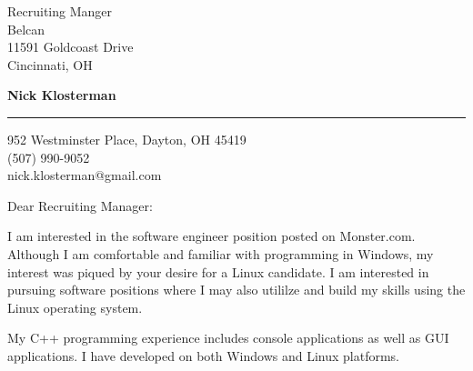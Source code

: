 \documentclass{letter} %
\begin{document}
\signature{Nick Klosterman}           %
\longindentation=0pt                       %
\let\raggedleft\raggedright                %
 
 
\begin{letter}{Recruiting Manger \\
Belcan  \\
11591 Goldcoast Drive\\
Cincinnati, OH
}

  \begin{flushright}
 \hfill   \large\bf Nick Klosterman  \\
\end{flushright}
\begin{flushright}
    \medskip\hrule height 1pt
    \hfill 952 Westminster Place, Dayton, OH 45419 \\
    \hfill (507) 990-9052 \\
    \hfill nick.klosterman@gmail.com
  \end{flushright} 
\vfill %

 
\opening{Dear Recruiting Manager:} 

\noindent 
I am interested in the software engineer position posted on Monster.com. 
Although I am comfortable and familiar with programming in Windows, my interest was piqued by your desire for a Linux candidate.
I am interested in pursuing software positions where I may also utililze and build my skills using the Linux operating system.

\noindent
My C++ programming experience includes console applications as well as GUI applications.
I have developed on both Windows and Linux platforms. 


\end{letter}
\end{document}
